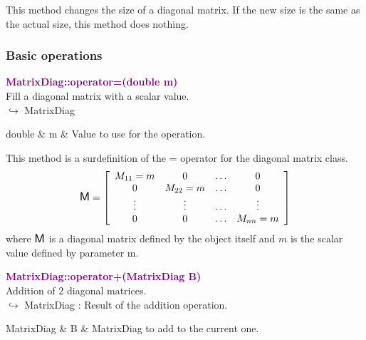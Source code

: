 This method changes the size of a diagonal matrix.
If the new size is the same as the actual size, this method does nothing.

\subsubsection{Basic operations}


\textcolor{purple}{\textbf{MatrixDiag::operator=(double m)}}\label{MatrixDiag::operator=(double m)}\\
Fill a diagonal matrix with a scalar value.\\ \hspace*{10mm}$\hookrightarrow$ MatrixDiag

\begin{tcolorbox}[width=\textwidth,myArgs,tabularx={ll|R}]
double & m & Value to use for the operation.
\end{tcolorbox}

This method is a surdefinition of the = operator for the diagonal matrix class.
\begin{equation*}
\mbox{\large\ensuremath{\mathsf{M}}}=\left[\begin{array}{cccc}
  M_{11}=m & 0 & \hdots & 0\\
  0 & M_{22}=m & \hdots & 0\\
  \vdots & \vdots & \hdots & \vdots\\
  0 & 0 & \hdots & M_{nn}=m
  \end{array}\right]
\end{equation*}
where $\mbox{\large\ensuremath{\mathsf{M}}}$ is a diagonal matrix defined by the object itself and $m$ is the scalar value defined by parameter m.

\textcolor{purple}{\textbf{MatrixDiag::operator+(MatrixDiag B)}}\label{MatrixDiag::operator+(MatrixDiag B)}\\
Addition of 2 diagonal matrices.\\ \hspace*{10mm}$\hookrightarrow$ MatrixDiag : Result of the addition operation.

\begin{tcolorbox}[width=\textwidth,myArgs,tabularx={ll|R}]
MatrixDiag & B & MatrixDiag to add to the current one.
\end{tcolorbox}

